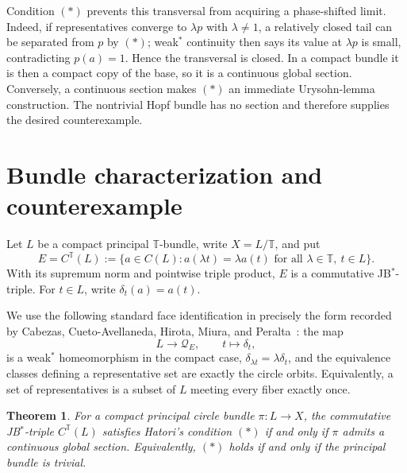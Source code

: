 \documentclass[11pt]{article}
\newtheorem{theorem}{Theorem}
\newcommand{\T}{\mathbb T}
\newcommand{\cQ}{\mathcal Q}
\begin{document}
Condition $(*)$ prevents this transversal from acquiring a phase-shifted
limit.  Indeed, if representatives converge to $\lambda p$ with
$\lambda\ne1$, a relatively closed tail can be separated from $p$ by $(*)$;
weak$^*$ continuity then says its value at $\lambda p$ is small, contradicting
$p(a)=1$.  Hence the transversal is closed.  In a compact bundle it is then a
compact copy of the base, so it is a continuous global section.  Conversely,
a continuous section makes $(*)$ an immediate Urysohn-lemma construction.
The nontrivial Hopf bundle has no section and therefore supplies the desired
counterexample.

\section{Bundle characterization and counterexample}

Let $L$ be a compact principal $\T$-bundle, write $X=L/\T$, and put
\[
 E=C^{\T}(L):=\{a\in C(L):a(\lambda t)=\lambda a(t)
       \text{ for all }\lambda\in\T,\ t\in L\}.
\]
With its supremum norm and pointwise triple product, $E$ is a commutative
JB$^*$-triple.  For $t\in L$, write $\delta_t(a)=a(t)$.

We use the following standard face identification in precisely the form
recorded by Cabezas, Cueto-Avellaneda, Hirota, Miura, and
Peralta~\cite[Section~3]{CabezasEtAl}: the map
\begin{equation}\label{eq:eval}
 L\longrightarrow\cQ_E,\qquad t\longmapsto\delta_t,
\end{equation}
is a weak$^*$ homeomorphism in the compact case,
$\delta_{\lambda t}=\lambda\delta_t$, and the equivalence classes defining a
representative set are exactly the circle orbits.  Equivalently, a set of
representatives is a subset of $L$ meeting every fiber exactly once.

\begin{theorem}\label{thm:characterization}
For a compact principal circle bundle $\pi:L\to X$, the commutative
JB$^*$-triple $C^{\T}(L)$ satisfies Hatori's condition $(*)$ if and only if
$\pi$ admits a continuous global section.  Equivalently, $(*)$ holds if and
only if the principal bundle is trivial.
\end{theorem}
\end{document}
